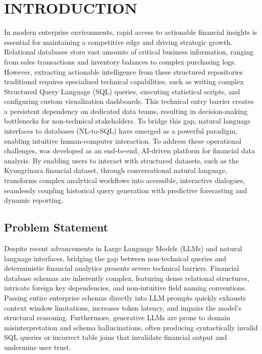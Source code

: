\section{INTRODUCTION}
\label{sec:introduction}

In modern enterprise environments, rapid access to actionable financial insights is essential for maintaining a competitive edge and driving strategic growth. Relational databases store vast amounts of critical business information, ranging from sales transactions and inventory balances to complex purchasing logs. However, extracting actionable intelligence from these structured repositories traditional requires specialized technical capabilities, such as writing complex Structured Query Language (SQL) queries, executing statistical scripts, and configuring custom visualization dashboards. This technical entry barrier creates a persistent dependency on dedicated data teams, resulting in decision-making bottlenecks for non-technical stakeholders. To bridge this gap, natural language interfaces to databases (NL-to-SQL) have emerged as a powerful paradigm, enabling intuitive human-computer interaction. To address these operational challenges, \projname{} was developed as an end-to-end, AI-driven platform for financial data analysis. By enabling users to interact with structured datasets, such as the Kyungrinara financial dataset, through conversational natural language, \projname{} transforms complex analytical workflows into accessible, interactive dialogues, seamlessly coupling historical query generation with predictive forecasting and dynamic reporting.

\subsection{Problem Statement}
\label{sub:problem-statement}

\noindent Despite recent advancements in Large Language Models (LLMs) and natural language interfaces, bridging the gap between non-technical queries and deterministic financial analytics presents severe technical barriers. Financial database schemas are inherently complex, featuring dense relational structures, intricate foreign key dependencies, and non-intuitive field naming conventions. Passing entire enterprise schemas directly into LLM prompts quickly exhausts context window limitations, increases token latency, and impairs the model's structural reasoning. Furthermore, generative LLMs are prone to domain misinterpretation and schema hallucinations, often producing syntactically invalid SQL queries or incorrect table joins that invalidate financial output and undermine user trust.

